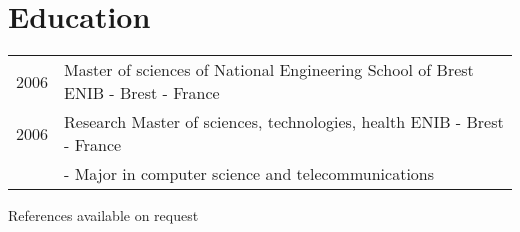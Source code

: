 \documentclass[10pt,letterpaper]{resume/resume}
\begin{document}
  \begin{minipage}[t]{\linewidth}
    \section{Education}
      \begin{tabularx}{\linewidth}{lX}%
        2006 & Master of sciences of National Engineering School of Brest \hfill ENIB - Brest - France\\ 
        2006 & Research Master of sciences, technologies, health \hfill ENIB - Brest - France\\
        & - Major in computer science and telecommunications\\
      \end{tabularx}%
  \end{minipage}

  \vfill
  \begin{center}References available on request\end{center}
\end{document}
